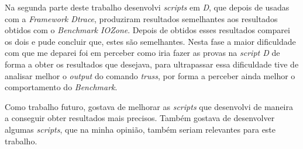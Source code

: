 \documentclass[conference,compsoc]{IEEEtran}
\begin{document}
Na segunda parte deste trabalho desenvolvi \textit{scripts} em \textit{D}, que depois de usadas com a \textit{Framework Dtrace}, produziram resultados semelhantes aos resultados obtidos com o \textit{Benchmark IOZone}. Depois de obtidos esses resultados comparei os dois e pude concluir que, estes são semelhantes. Nesta fase a maior dificuldade com que me deparei foi em perceber como iria fazer as provas na \textit{script D} de forma a obter os resultados que desejava, para ultrapassar essa dificuldade tive de analisar melhor o \textit{output} do comando \textit{truss}, por forma a perceber ainda melhor o comportamento do \textit{Benchmark}.

Como trabalho futuro, gostava de melhorar as \textit{scripts} que desenvolvi de maneira a conseguir obter resultados mais precisos. Também gostava de desenvolver algumas \textit{scripts}, que na minha opinião, também seriam relevantes para este trabalho.
%
%

\end{document}
